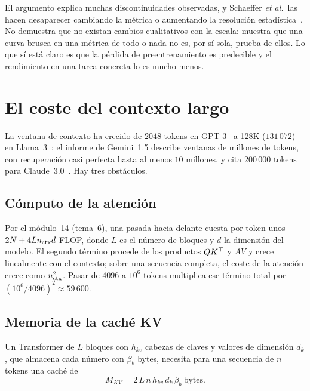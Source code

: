 \addtocounter{figure}{1}%

\begin{observacion}
El argumento explica muchas discontinuidades observadas, y Schaeffer \emph{et al.}\ las hacen desaparecer cambiando la métrica o aumentando la resolución estadística~\cite{schaeffer}. No demuestra que no existan cambios cualitativos con la escala: muestra que una curva brusca en una métrica de todo o nada no es, por sí sola, prueba de ellos. Lo que sí está claro es que la pérdida de preentrenamiento es predecible y el rendimiento en una tarea concreta lo es mucho menos.
\end{observacion}

\section{El coste del contexto largo}

La ventana de contexto ha crecido de $2048$ tokens en GPT-3~\cite{brown} a 128K ($131\,072$) en Llama~3~\cite{llama3}; el informe de Gemini~1.5 describe ventanas de millones de tokens, con recuperación casi perfecta hasta al menos $10$ millones, y cita $200\,000$ tokens para Claude~3.0~\cite{gemini15}. Hay tres obstáculos.

\subsection*{Cómputo de la atención}

Por el módulo~14 (tema~6), una pasada hacia delante cuesta por token unos $2N+4Ln_{\mathrm{ctx}} d$ FLOP, donde $L$ es el número de bloques y $d$ la dimensión del modelo. El segundo término procede de los productos $QK^{\top}$ y $AV$ y crece linealmente con el contexto; sobre una secuencia completa, el coste de la atención crece como $n_{\mathrm{ctx}}^{2}$. Pasar de $4096$ a $10^{6}$ tokens multiplica ese término total por $(10^{6}/4096)^{2}\approx 59\,600$.

\addtocounter{definicion}{1}%

\subsection*{Memoria de la caché KV}

\begin{proposicion}\label{prop:kv}
Un Transformer de $L$ bloques con $h_{kv}$ cabezas de claves y valores de dimensión $d_k$, que almacena cada número con $\beta_b$ bytes, necesita para una secuencia de $n$ tokens una caché de
\[
M_{KV}=2\,L\,n\,h_{kv}\,d_k\,\beta_b\ \text{bytes}.
\]
\end{proposicion}

